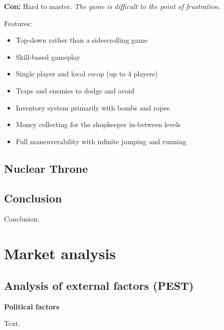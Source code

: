 \documentclass[12p]{article}
\begin{document}
\textbf{Con:} Hard to master. \emph{The game is difficult to the point of frustration.}

Features:

\begin{itemize}
    \item Top-down rather than a sidescrolling game
    \item Skill-based gameplay
    \item Single player and local co-op (up to 4 players)
    \item Traps and enemies to dodge and avoid
    \item Inventory system primarily with bombs and ropes
    \item Money collecting for the shopkeeper in-between levels
    \item Full maneuverability with infinite jumping and running
\end{itemize}


\subsection{Nuclear Throne}


\subsection{Conclusion}
Conclusion.


\newpage
\section{Market analysis} \label{MarketAnalysis}


\subsection{Analysis of external factors (PEST)} \label{PEST}

\textbf{Political factors}

Text. \medskip
\end{document}
